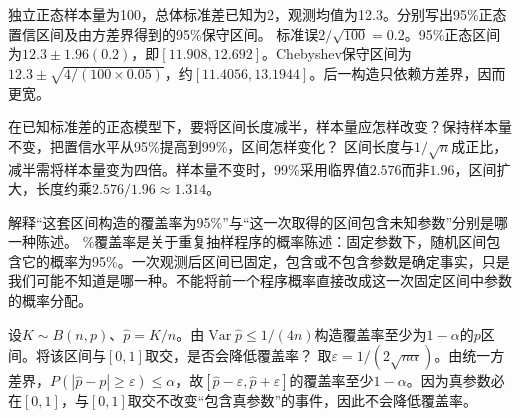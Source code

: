 独立正态样本量为100，总体标准差已知为2，观测均值为12.3。分别写出95\%正态置信区间及由方差界得到的95\%保守区间。
\solutionanswer
标准误\(2/\sqrt{100}=0.2\)。95\%正态区间为\(12.3\pm1.96(0.2)\)，即\([11.908,12.692]\)。Chebyshev保守区间为\(12.3\pm\sqrt{4/(100\times0.05)}\)，约\([11.4056,13.1944]\)。后一构造只依赖方差界，因而更宽。


在已知标准差的正态模型下，要将区间长度减半，样本量应怎样改变？保持样本量不变，把置信水平从95\%提高到99\%，区间怎样变化？
\solutionanswer
区间长度与\(1/\sqrt n\)成正比，减半需将样本量变为四倍。样本量不变时，99\%采用临界值\(2.576\)而非\(1.96\)，区间扩大，长度约乘\(2.576/1.96\approx1.314\)。


解释“这套区间构造的覆盖率为95\%”与“这一次取得的区间包含未知参数”分别是哪一种陈述。
\%覆盖率是关于重复抽样程序的概率陈述：固定参数下，随机区间包含它的概率为95\%。一次观测后区间已固定，包含或不包含参数是确定事实，只是我们可能不知道是哪一种。不能将前一个程序概率直接改成这一次固定区间中参数的概率分配。


设\(K\sim B(n,p)\)、\(\widehat p=K/n\)。由\(\operatorname{Var}\widehat p\le1/(4n)\)构造覆盖率至少为\(1-\alpha\)的\(p\)区间。将该区间与\([0,1]\)取交，是否会降低覆盖率？
\solutionanswer
取\(\varepsilon=1/(2\sqrt{n\alpha})\)。由统一方差界，\(P(|\widehat p-p|\ge\varepsilon)\le\alpha\)，故\([\widehat p-\varepsilon,\widehat p+\varepsilon]\)的覆盖率至少\(1-\alpha\)。因为真参数必在\([0,1]\)，与\([0,1]\)取交不改变“包含真参数”的事件，因此不会降低覆盖率。
\par
